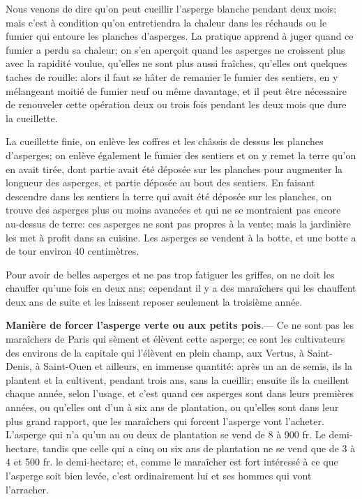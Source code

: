 \documentclass[10pt,a4paper]{book}
\begin{document}
Nous venons de dire qu'on peut cueillir l'asperge blanche pendant deux mois; mais c'est à condition qu'on entretiendra la chaleur dans les réchauds ou le fumier qui entoure les planches d'asperges. La pratique apprend à juger quand ce fumier a perdu sa chaleur; on s'en aperçoit quand les asperges ne croissent plus avec la rapidité voulue, qu'elles ne sont plus aussi fraîches, qu'elles ont quelques taches de rouille: alors il faut se hâter de remanier le fumier des sentiers, en y mélangeant moitié de fumier neuf ou même davantage, et il peut être nécessaire de renouveler cette opération deux ou trois fois pendant les deux mois que dure la cueillette.

La cueillette finie, on enlève les coffres et les châssis de dessus les planches d'asperges; on enlève également le fumier des sentiers et on y remet la terre qu'on en avait tirée, dont partie avait été déposée sur les planches pour augmenter la longueur des asperges, et partie déposée au bout des sentiers. En faisant descendre dans les sentiers la terre qui avait été déposée sur les planches, on trouve des asperges plus ou moins avancées et qui ne se montraient pas encore au-dessus de terre: ces asperges ne sont pas propres à la vente; mais la jardinière les met à profit dans sa cuisine. Les asperges se vendent à la botte, et une botte a de tour environ 40 centimètres.

Pour avoir de belles asperges et ne pas trop fatiguer les griffes, on ne doit les chauffer qu'une fois en deux ans; cependant il y a des maraîchers qui les chauffent deux ans de suite et les laissent reposer seulement la troisième année.

\textbf{Manière de forcer l'asperge verte ou aux petits pois}.--- Ce ne sont pas les maraîchers de Paris qui sèment et élèvent cette asperge; ce sont les cultivateurs des environs de la capitale qui l'élèvent en plein champ, aux Vertus, à Saint-Denis, à Saint-Ouen et ailleurs, en immense quantité: après un an de semis, ils la plantent et la cultivent, pendant trois ans, sans la cueillir; ensuite ils la cueillent chaque année, selon l'usage, et c'est quand ces asperges sont dans leurs premières années, ou qu'elles ont d'un à six ans de plantation, ou qu'elles sont dans leur plus grand rapport, que les maraîchers qui forcent l'asperge vont l'acheter. L'asperge qui n'a qu'un an ou deux de plantation se vend de 8 à 900 fr. Le demi-hectare, tandis que celle qui a cinq ou six ans de plantation ne se vend que de 3 à 4 et 500 fr. le demi-hectare; et, comme le maraîcher est fort intéressé à ce que l'asperge soit bien levée, c'est ordinairement lui et ses hommes qui vont l'arracher.
\end{document}
